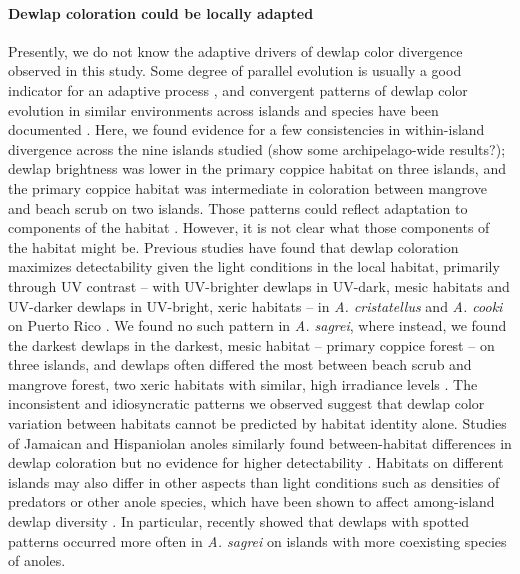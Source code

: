 \paragraph{Dewlap coloration could be locally adapted} Presently, we do not know the adaptive drivers of dewlap  color divergence observed in this study. Some degree of parallel evolution is usually a good indicator for an adaptive process \citep{Losos2011}, and convergent patterns of dewlap color evolution in similar environments across islands and species have been documented \citep{Thorpe2002a, Thorpe2002b}. Here, we found evidence for a few consistencies in within-island divergence across the nine islands studied (show some archipelago-wide results?); dewlap brightness was lower in the primary coppice habitat on three islands, and the primary coppice habitat was intermediate in coloration between mangrove and beach scrub on two islands. Those patterns could reflect adaptation to components of the habitat \citep{Endler1988}. However, it is not clear what those components of the habitat might be. Previous studies have found that dewlap coloration maximizes detectability given the light conditions in the local habitat, primarily through UV contrast -- with UV-brighter dewlaps in UV-dark, mesic habitats and UV-darker dewlaps in UV-bright, xeric habitats -- in \textit{A. cristatellus} and \textit{A. cooki} on Puerto Rico \citep{Leal2002, Leal2004}. We found no such pattern in \textit{A. sagrei}, where instead, we found the darkest dewlaps in the darkest, mesic habitat -- primary coppice forest -- on three islands, and dewlaps often differed the most between beach scrub and mangrove forest, two xeric habitats with similar, high irradiance levels \citep{Howard1950, Schoener1968}. The inconsistent and idiosyncratic patterns we observed suggest that dewlap color variation between habitats cannot be predicted by habitat identity alone. Studies of Jamaican and Hispaniolan anoles similarly found between-habitat differences in dewlap coloration but no evidence for higher detectability \citep{Fleishman2009, Ng2012}. Habitats on different islands may also differ in other aspects than light conditions such as densities of predators or other anole species, which have been shown to affect among-island dewlap diversity \citep{Vanhooydonck2009, Baeckens2018}. In particular, \citet{Baeckens2018} recently showed that dewlaps with spotted patterns occurred more often in \textit{A. sagrei} on islands with more coexisting species of anoles.


